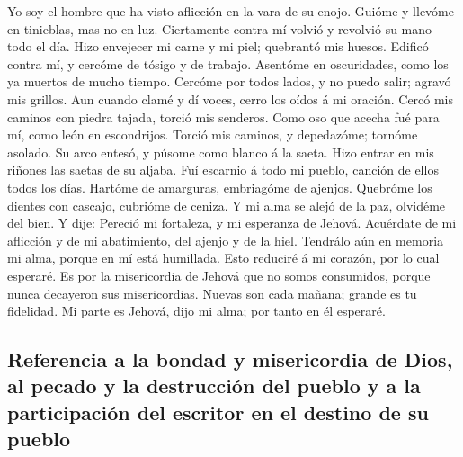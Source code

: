  Yo soy el hombre que ha visto aflicción en la vara de su
enojo.  Guióme y llevóme en tinieblas, mas no en luz.
 Ciertamente contra mí volvió y revolvió su mano todo el
día.  Hizo envejecer mi carne y mi piel; quebrantó mis
huesos.  Edificó contra mí, y cercóme de tósigo y de
trabajo.  Asentóme en oscuridades, como los ya muertos de
mucho tiempo.  Cercóme por todos lados, y no puedo salir;
agravó mis grillos.  Aun cuando clamé y dí voces, cerro
los oídos á mi oración.  Cercó mis caminos con piedra
tajada, torció mis senderos.  Como oso que acecha fué
para mí, como león en escondrijos.  Torció mis caminos, y
depedazóme; tornóme asolado.  Su arco entesó, y púsome
como blanco á la saeta.  Hizo entrar en mis riñones las
saetas de su aljaba.  Fuí escarnio á todo mi pueblo,
canción de ellos todos los días.  Hartóme de amarguras,
embriagóme de ajenjos.  Quebróme los dientes con cascajo,
cubrióme de ceniza.  Y mi alma se alejó de la paz,
olvidéme del bien.  Y dije: Pereció mi fortaleza, y mi
esperanza de Jehová.  Acuérdate de mi aflicción y de mi
abatimiento, del ajenjo y de la hiel.  Tendrálo aún en
memoria mi alma, porque en mí está humillada.  Esto
reduciré á mi corazón, por lo cual esperaré.  Es por la
misericordia de Jehová que no somos consumidos, porque nunca decayeron
sus misericordias.  Nuevas son cada mañana; grande es tu
fidelidad.  Mi parte es Jehová, dijo mi alma; por tanto
en él esperaré.

\hypertarget{referencia-a-la-bondad-y-misericordia-de-dios-al-pecado-y-la-destrucciuxf3n-del-pueblo-y-a-la-participaciuxf3n-del-escritor-en-el-destino-de-su-pueblo}{%
\subsection{Referencia a la bondad y misericordia de Dios, al pecado y
la destrucción del pueblo y a la participación del escritor en el
destino de su
pueblo}\label{referencia-a-la-bondad-y-misericordia-de-dios-al-pecado-y-la-destrucciuxf3n-del-pueblo-y-a-la-participaciuxf3n-del-escritor-en-el-destino-de-su-pueblo}}

